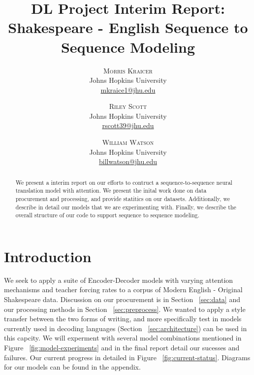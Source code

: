 \documentclass[twoside,twocolumn]{article}
\title{DL Project Interim Report:\\
       Shakespeare - English Sequence to Sequence Modeling}
\author{%
\textsc{Morris Kraicer} \\[1ex]
\normalsize Johns Hopkins University \\
\normalsize \href{mailto:mkraice1@jhu.edu}{mkraice1@jhu.edu}
 \and
 \textsc{Riley Scott} \\[1ex]
\normalsize Johns Hopkins University \\
\normalsize \href{mailto:rscott39@jhu.edu}{rscott39@jhu.edu}
 \and
  \textsc{William Watson} \\[1ex]
\normalsize Johns Hopkins University \\
\normalsize \href{mailto:billwatson@jhu.edu}{billwatson@jhu.edu}
}
\date{}%
\begin{document}
\maketitle



\begin{abstract}
\noindent
We present a interim report on our efforts to contruct a sequence-to-sequence
neural translation model with attention. We present the inital work done on
data procurement and processing, and provide statitics on our datasets.
Additionally, we describe in detail our models that we are experimenting with.
Finally, we describe the overall structure of our code to support sequence
to sequence modeling.
\end{abstract}


\section{Introduction}
We seek to apply a suite of Encoder-Decoder models with varying attention
mechanisms and teacher forcing rates to a corpus of Modern English - Original
Shakespeare data. Discussion on our procurement is in Section ~\ref{sec:data}
and our processing methods in Section ~\ref{sec:preprocess}. We wanted to
apply a style transfer between the two forms of writing,
and more specifically test in models currently
used in decoding languages (Section ~\ref{sec:architecture}) can be used in this
capcity. We will experment with several model combinations mentioned in Figure
~\ref{fig:model-experiments} and in the final report detail our sucesses
and failures. Our current progress in detailed in Figure
~\ref{fig:current-status}. Diagrams for our models can be found in the appendix.

\end{document}
